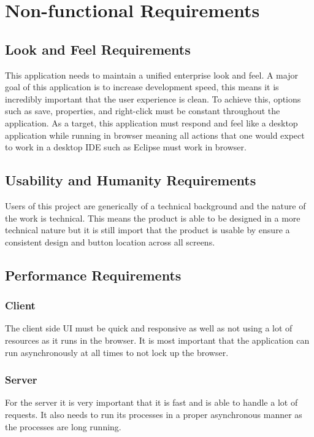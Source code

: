 \documentclass[12pt, titlepage]{article}
\begin{document}
\section{Non-functional Requirements}

  \subsection{Look and Feel Requirements}
	This application needs to maintain a unified enterprise look and feel. A
	major goal of this application is to increase development speed, this means
	it is incredibly important that the user experience is clean. To achieve
	this, options such as save, properties, and right-click must be constant
	throughout the application. As a target, this application must respond and
	feel like a desktop application while running in browser meaning all actions
	that one would expect to work in a desktop IDE such as Eclipse must work in
	browser.

  \subsection{Usability and Humanity Requirements}
		Users of this project are generically of a technical background and the
		nature of the work  is technical. This means the product is able to be
		designed in a more technical nature but it is still import that the product
		is usable by ensure a consistent design and button location across all
		screens.

  \subsection{Performance Requirements}
    \subsubsection{Client}
		The client side UI must be quick and responsive as well as not using a lot
		of resources as it runs in the browser. It is most important that the
		application can run asynchronously at all times to not lock up the browser.

    \subsubsection{Server}
		For the server it is very important that it is fast and is able to handle a
		lot of requests. It also needs to run its processes in a proper
		asynchronous manner as the processes are long running.
\end{document}
